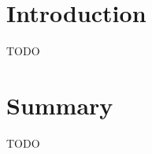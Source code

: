 \label{chap:apdl_ecosystem}

\section{Introduction}
\label{sec:apdl_ecosystem_intro}

TODO

\section{Summary}
\label{sec:apdl_ecosystem_summary}

TODO

